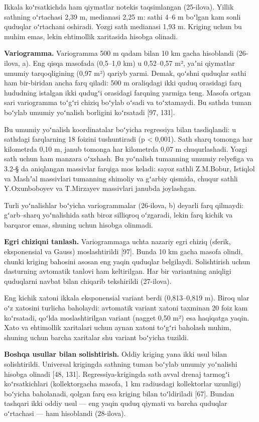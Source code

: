 Ikkala koʻrsatkichda ham qiymatlar notekis taqsimlangan (25-ilova).
Yillik sathning oʻrtachasi 2,39 m, medianasi 2,25 m: sathi 4--6 m
boʻlgan kam sonli quduqlar oʻrtachani oshiradi. Yozgi sath medianasi
1,93 m. Kriging uchun bu muhim emas, lekin ehtimollik xaritasida hisobga
olinadi.

\textbf{Variogramma.} Variogramma 500 m qadam bilan 10 km gacha
hisoblandi (26-ilova, a). Eng qisqa masofada (0,5--1,0 km) u 0,52--0,57
m², yaʼni qiymatlar umumiy tarqoqligining (0,97 m²) qariyb yarmi. Demak,
qoʻshni quduqlar sathi ham bir-biridan ancha farq qiladi: 500 m
oraliqdagi ikki quduq orasidagi farq hududning istalgan ikki qudugʻi
orasidagi farqning yarmiga teng. Masofa ortgan sari variogramma toʻgʻri
chiziq boʻylab oʻsadi va toʻxtamaydi. Bu sathda tuman boʻylab umumiy
yoʻnalish borligini koʻrsatadi {[}97, 131{]}.

Bu umumiy yoʻnalish koordinatalar boʻyicha regressiya bilan tasdiqlandi:
u sathdagi farqlarning 18 foizini tushuntiradi (p \textless{} 0,001).
Sath sharq tomonga har kilometrda 0,10 m, janub tomonga har kilometrda
0,07 m chuqurlashadi. Yozgi sath uchun ham manzara oʻxshash. Bu
yoʻnalish tumanning umumiy relyefiga va 3.2-§ da aniqlangan massivlar
farqiga mos keladi: sayoz sathli Z.M.Bobur, Istiqlol va Mashʼal
massivlari tumanning shimoliy va gʻarbiy qismida, chuqur sathli
Y.Oxunboboyev va T.Mirzayev massivlari janubda joylashgan.

Turli yoʻnalishlar boʻyicha variogrammalar (26-ilova, b) deyarli farq
qilmaydi: gʻarb--sharq yoʻnalishida sath biroz silliqroq oʻzgaradi,
lekin farq kichik va barqaror emas, shuning uchun hisobga olinmadi.

\textbf{Egri chiziqni tanlash.} Variogrammaga uchta nazariy egri chiziq
(sferik, eksponensial va Gauss) moslashtirildi {[}97{]}. Bunda 10 km
gacha masofa olindi, chunki kriging bahosini asosan eng yaqin quduqlar
belgilaydi. Solishtirish uchun dasturning avtomatik tanlovi ham
keltirilgan. Har bir variantning aniqligi quduqlarni navbat bilan
chiqarib tekshirildi (27-ilova).

Eng kichik xatoni ikkala eksponensial variant berdi (0,813--0,819 m).
Biroq ular oʻz xatosini turlicha baholaydi: avtomatik variant xatoni
taxminan 20 foiz kam koʻrsatadi, qoʻlda moslashtirilgan variant (nagget
0,50 m²) esa haqiqatga yaqin. Xato va ehtimollik xaritalari uchun aynan
xatoni toʻgʻri baholash muhim, shuning uchun barcha xaritalar shu
variant boʻyicha tuzildi.

\textbf{Boshqa usullar bilan solishtirish.} Oddiy kriging yana ikki usul
bilan solishtirildi. Universal krigingda sathning tuman boʻylab umumiy
yoʻnalishi hisobga olinadi {[}48, 131{]}. Regressiya-krigingda sath
avval drenaj tarmogʻi koʻrsatkichlari (kollektorgacha masofa, 1 km
radiusdagi kollektorlar uzunligi) boʻyicha baholanadi, qolgan farq esa
kriging bilan toʻldiriladi {[}67{]}. Bundan tashqari ikki oddiy usul ---
eng yaqin quduq qiymati va barcha quduqlar oʻrtachasi --- ham hisoblandi
(28-ilova).

